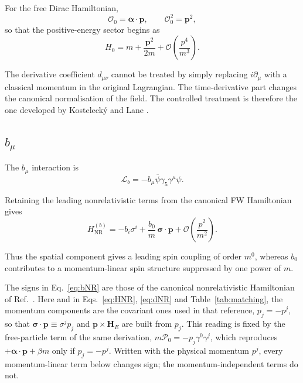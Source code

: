 \documentclass[aps,prd,reprint,superscriptaddress,nofootinbib]{revtex4-2}
\newcommand{\NR}{\mathrm{NR}}
\begin{document}
	For the free Dirac Hamiltonian,
	\begin{equation}
		\mathcal O_0=\boldsymbol{\alpha}\cdot\mathbf p,
		\qquad
		\mathcal O_0^2=\mathbf p^2,
	\end{equation}
	so that the positive-energy sector begins as
	\begin{equation}
		H_0=m+\frac{\mathbf p^2}{2m}
		+\mathcal O\!\left(\frac{p^4}{m^3}\right).
	\end{equation}
	
	The derivative coefficient $d_{\mu\nu}$ cannot be treated by simply
	replacing $i\partial_\mu$ with a classical momentum in the original
	Lagrangian. The time-derivative part changes the canonical
	normalisation of the field. The controlled treatment is therefore the
	one developed by Kostelecký and Lane \cite{KosteleckyLane1999}.
	
	\subsection{$b_\mu$}
	
	The $b_\mu$ interaction is
	\begin{equation}
		\mathcal L_b
		=
		-b_\mu\bar\psi\gamma_5\gamma^\mu\psi .
	\end{equation}
	
	Retaining the leading nonrelativistic terms from the canonical FW
	Hamiltonian gives
	\begin{equation}
		H_{\NR}^{(b)}
		=
		-b_i\sigma^i
		+\frac{b_0}{m}\,
		\boldsymbol{\sigma}\cdot\mathbf p
		+\mathcal O\!\left(\frac{p^2}{m^2}\right).
		\label{eq:bNR}
	\end{equation}
	
	Thus the spatial component gives a leading spin coupling of order
	$m^0$, whereas $b_0$ contributes to a momentum-linear spin structure
	suppressed by one power of $m$.
	
	The signs in Eq.~\eqref{eq:bNR} are those of the canonical
nonrelativistic Hamiltonian of Ref.~\cite{KosteleckyLane1999}. Here and
in Eqs.~\eqref{eq:HNR}, \eqref{eq:dNR} and Table~\ref{tab:matching}, the
momentum components are the covariant ones used in that reference,
$p_j=-p^j$, so that $\boldsymbol{\sigma}\cdot\mathbf p\equiv\sigma^j p_j$
and $\mathbf p\times\mathbf H_E$ are built from $p_j$. This reading is
fixed by the free-particle term of the same derivation,
$m\mathcal P_0=-p_j\gamma^0\gamma^j$, which reproduces
$+\boldsymbol{\alpha}\cdot\mathbf p+\beta m$ only if $p_j=-p^j$.
Written with the physical momentum $p^j$, every momentum-linear term
below changes sign; the momentum-independent terms do not.
	
\end{document}
